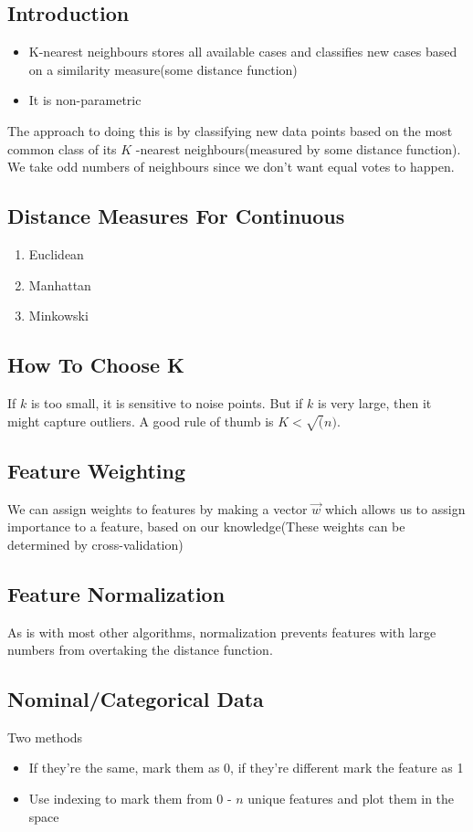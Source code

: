 \documentclass[11pt]{article}
\begin{document}
\subsection{Introduction}
\label{sec:orgeabc15d}

\begin{itemize}
\item K-nearest neighbours stores all available cases and classifies new cases based on a similarity measure(some distance function)
\item It is non-parametric
\end{itemize}

The approach to doing this is by classifying new data points based on the most common class of its \(K\) -nearest neighbours(measured by some distance function). We take odd numbers of neighbours since we don't want equal votes to happen.
\subsection{Distance Measures For Continuous}
\label{sec:org6e82ec5}
\begin{enumerate}
\item Euclidean
\item Manhattan
\item Minkowski
\end{enumerate}
\subsection{How To Choose K}
\label{sec:orgf43d87d}
If \(k\) is too small, it is sensitive to noise points. But if \(k\) is very large, then it might capture outliers. A good rule of thumb is \(K < \sqrt(n)\).
\subsection{Feature Weighting}
\label{sec:orge39ea54}
We can assign weights to features by making a vector \(\vec{w}\) which allows us to assign importance to a feature, based on our knowledge(These weights can be determined by cross-validation)
\subsection{Feature Normalization}
\label{sec:org801b8b0}
As is with most other algorithms, normalization prevents features with large numbers from overtaking the distance function.
\subsection{Nominal/Categorical Data}
\label{sec:org8807adb}
Two methods
\begin{itemize}
\item If they're the same, mark them as 0, if they're different mark the feature as 1
\item Use indexing to mark them from 0 - \(n\) unique features and plot them in the space
\end{itemize}
\end{document}
